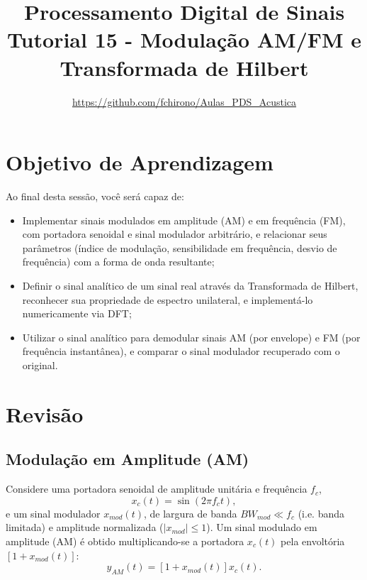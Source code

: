 \documentclass[a4paper,twoside,12pt]{article}
\title{\vspace{-2cm} Processamento Digital de Sinais\\ Tutorial 15 - Modulação AM/FM e Transformada de Hilbert}
\author{\url{https://github.com/fchirono/Aulas_PDS_Acustica}}
\begin{document}
	\date{}
	\maketitle
	
	\section*{Objetivo de Aprendizagem}
	Ao final desta sessão, você será capaz de:
	\begin{itemize}
		\item Implementar sinais modulados em amplitude (AM) e em frequência (FM), com portadora senoidal e sinal modulador arbitrário, e relacionar seus parâmetros (índice de modulação, sensibilidade em frequência, desvio de frequência) com a forma de onda resultante;
		\item Definir o sinal analítico de um sinal real através da Transformada de Hilbert, reconhecer sua propriedade de espectro unilateral, e implementá-lo numericamente via DFT;
		\item Utilizar o sinal analítico para demodular sinais AM (por envelope) e FM (por frequência instantânea), e comparar o sinal modulador recuperado com o original.
	\end{itemize}
	
	\begingroup
	\let\clearpage\relax
	\tableofcontents
	\endgroup
	
	\section{Revisão}
	
	\subsection{Modulação em Amplitude (AM)}
	\label{sec:AM}
	
	Considere uma portadora senoidal de amplitude unitária e frequência $f_c$,
	\begin{equation}
		x_c(t) = \sin(2\pi f_c t),
	\end{equation}
	e um sinal modulador $x_{mod}(t)$, de largura de banda $BW_{mod} \ll f_c$ (i.e. banda limitada) e amplitude normalizada ($|x_{mod}| \leq 1$). Um sinal modulado em amplitude (AM) é obtido multiplicando-se a portadora $x_c(t)$ pela envoltória $\left[1 + x_{mod}(t)\right]$:
	\begin{equation}
		y_{AM}(t) = \left[1 + x_{mod}(t)\right] x_c(t).
		\label{eq:AM}
	\end{equation}
	
\end{document}
